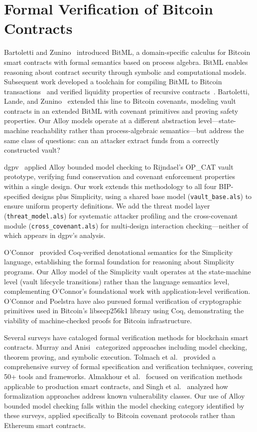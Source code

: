 \section{Formal Verification of Bitcoin Contracts} \label{se:rw_formal}

Bartoletti and Zunino~\cite{BZ18} introduced BitML, a domain-specific calculus for
Bitcoin smart contracts with formal semantics based on process algebra. BitML enables
reasoning about contract security through symbolic and computational models.
Subsequent work developed a toolchain for compiling BitML to Bitcoin
transactions~\cite{ABL19} and verified liquidity properties of recursive
contracts~\cite{BLM22}. Bartoletti, Lande, and Zunino~\cite{BLZ20} extended this
line to Bitcoin covenants, modeling vault contracts in an extended BitML with
covenant primitives and proving safety properties. Our Alloy models operate at a
different abstraction level---state-machine reachability rather than process-algebraic
semantics---but address the same class of questions: can an attacker extract funds
from a correctly constructed vault?

dgpv~\cite{dgpv24} applied Alloy bounded model checking to Rijndael's OP\_CAT vault
prototype, verifying fund conservation and covenant enforcement properties within
a single design. Our work extends this methodology to all four BIP-specified
designs plus Simplicity, using a shared base model (\texttt{vault\_base.als}) to
ensure uniform property definitions. We add the threat model layer
(\texttt{threat\_model.als}) for systematic attacker profiling and the cross-covenant
module (\texttt{cross\_covenant.als}) for multi-design interaction
checking---neither of which appears in dgpv's analysis.

O'Connor~\cite{OC17} provided Coq-verified denotational semantics for the Simplicity
language, establishing the formal foundation for reasoning about Simplicity programs.
Our Alloy model of the Simplicity vault operates at the state-machine level (vault
lifecycle transitions) rather than the language semantics level, complementing
O'Connor's foundational work with application-level verification. O'Connor and
Poelstra have also pursued formal verification of cryptographic primitives used in
Bitcoin's libsecp256k1 library using Coq, demonstrating the viability of machine-checked
proofs for Bitcoin infrastructure.

Several surveys have cataloged formal verification methods for blockchain smart
contracts. Murray and Anisi~\cite{Murray19} categorized approaches including model
checking, theorem proving, and symbolic execution. Tolmach et al.~\cite{Tolmach21}
provided a comprehensive survey of formal specification and verification techniques,
covering 50+ tools and frameworks. Almakhour et al.~\cite{Almakhour20} focused on
verification methods applicable to production smart contracts, and Singh
et al.~\cite{Singh20} analyzed how formalization approaches address known
vulnerability classes. Our use of Alloy bounded model checking falls within the model
checking category identified by these surveys, applied specifically to Bitcoin
covenant protocols rather than Ethereum smart contracts.

